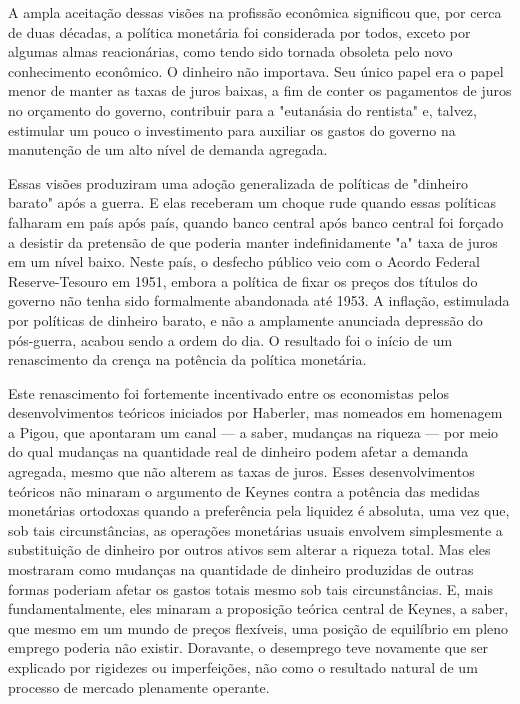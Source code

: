 \documentclass[12pt]{article}
\begin{document}
A ampla aceitação dessas visões na profissão econômica significou que, por cerca de duas décadas, a política monetária foi considerada por todos, exceto por algumas almas reacionárias, como tendo sido tornada obsoleta pelo novo conhecimento econômico. O dinheiro não importava. Seu único papel era o papel menor de manter as taxas de juros baixas, a fim de conter os pagamentos de juros no orçamento do governo, contribuir para a "eutanásia do rentista" e, talvez, estimular um pouco o investimento para auxiliar os gastos do governo na manutenção de um alto nível de demanda agregada.

Essas visões produziram uma adoção generalizada de políticas de "dinheiro barato" após a guerra. E elas receberam um choque rude quando essas políticas falharam em país após país, quando banco central após banco central foi forçado a desistir da pretensão de que poderia manter indefinidamente "a" taxa de juros em um nível baixo. Neste país, o desfecho público veio com o Acordo Federal Reserve-Tesouro em 1951, embora a política de fixar os preços dos títulos do governo não tenha sido formalmente abandonada até 1953. A inflação, estimulada por políticas de dinheiro barato, e não a amplamente anunciada depressão do pós-guerra, acabou sendo a ordem do dia. O resultado foi o início de um renascimento da crença na potência da política monetária.

Este renascimento foi fortemente incentivado entre os economistas pelos desenvolvimentos teóricos iniciados por Haberler, mas nomeados em homenagem a Pigou, que apontaram um canal — a saber, mudanças na riqueza — por meio do qual mudanças na quantidade real de dinheiro podem afetar a demanda agregada, mesmo que não alterem as taxas de juros. Esses desenvolvimentos teóricos não minaram o argumento de Keynes contra a potência das medidas monetárias ortodoxas quando a preferência pela liquidez é absoluta, uma vez que, sob tais circunstâncias, as operações monetárias usuais envolvem simplesmente a substituição de dinheiro por outros ativos sem alterar a riqueza total. Mas eles mostraram como mudanças na quantidade de dinheiro produzidas de outras formas poderiam afetar os gastos totais mesmo sob tais circunstâncias. E, mais fundamentalmente, eles minaram a proposição teórica central de Keynes, a saber, que mesmo em um mundo de preços flexíveis, uma posição de equilíbrio em pleno emprego poderia não existir. Doravante, o desemprego teve novamente que ser explicado por rigidezes ou imperfeições, não como o resultado natural de um processo de mercado plenamente operante.
\end{document}
